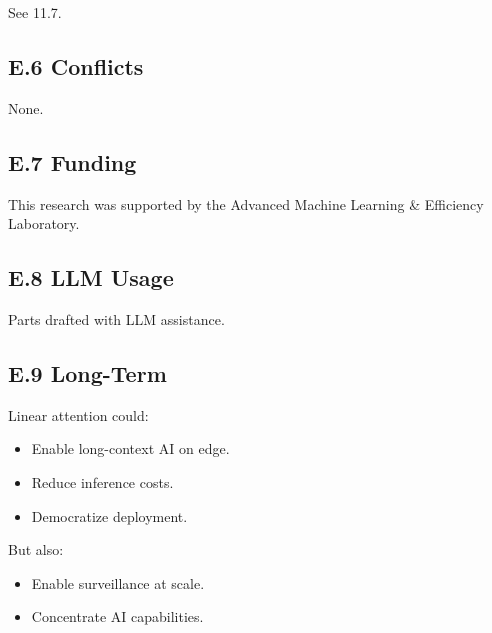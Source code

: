 See  11.7.

\subsection{E.6 Conflicts}

None.

\subsection{E.7 Funding}

This research was supported by the Advanced Machine Learning \& Efficiency Laboratory.

\subsection{E.8 LLM Usage}

Parts drafted with LLM assistance.

\subsection{E.9 Long-Term}

Linear attention could:
\begin{itemize}
\item Enable long-context AI on edge.
\item Reduce inference costs.
\item Democratize deployment.

\end{itemize}
But also:
\begin{itemize}
\item Enable surveillance at scale.
\item Concentrate AI capabilities.

\end{itemize}
